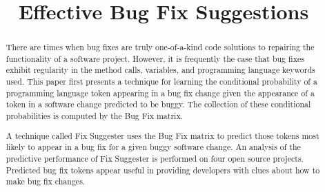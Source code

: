 \documentclass[conference]{IEEEtran}
\begin{document}
\title{Effective Bug Fix Suggestions}

\author{
}
% 
		
\maketitle

\begin{abstract}

There are times when bug fixes are truly one-of-a-kind code solutions to repairing the functionality of a software project. However, it is frequently the case that bug fixes exhibit regularity in the method calls, variables, and programming language keywords used. This paper first presents a technique for learning the conditional probability of a programming language token appearing in a bug fix change given the appearance of a token in a software change predicted to be buggy. The collection of these conditional probabilities is computed by the Bug Fix matrix.

A technique called Fix Suggester uses the Bug Fix matrix to predict those tokens most likely to appear in a bug fix for a given buggy software change. An analysis of the predictive performance of Fix Suggester is performed on four open source projects. Predicted bug fix tokens appear useful in providing developers with clues about how to make bug fix changes.

\end{abstract}
\end{document}
